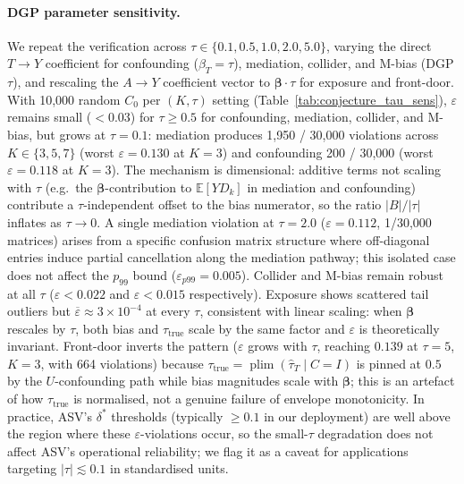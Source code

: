 \paragraph{DGP parameter sensitivity.}
We repeat the verification across $\tau \in \{0.1, 0.5, 1.0, 2.0, 5.0\}$, varying the direct $T{\to}Y$ coefficient for confounding ($\beta_T{=}\tau$), mediation, collider, and M-bias (DGP $\tau$), and rescaling the $A{\to}Y$ coefficient vector to $\boldsymbol{\beta}\cdot\tau$ for exposure and front-door. With 10{,}000 random $C_0$ per $(K,\tau)$ setting (Table~\ref{tab:conjecture_tau_sens}), $\varepsilon$ remains small ($< 0.03$) for $\tau \geq 0.5$ for confounding, mediation, collider, and M-bias, but grows at $\tau{=}0.1$: mediation produces 1{,}950 / 30{,}000 violations across $K \in \{3,5,7\}$ (worst $\varepsilon{=}0.130$ at $K{=}3$) and confounding 200 / 30{,}000 (worst $\varepsilon{=}0.118$ at $K{=}3$). The mechanism is dimensional: additive terms not scaling with $\tau$ (e.g.\ the $\boldsymbol{\beta}$-contribution to $\mathbb{E}[Y D_k]$ in mediation and confounding) contribute a $\tau$-independent offset to the bias numerator, so the ratio $|B|/|\tau|$ inflates as $\tau \to 0$. A single mediation violation at $\tau{=}2.0$ ($\varepsilon{=}0.112$, 1/30{,}000 matrices) arises from a specific confusion matrix structure where off-diagonal entries induce partial cancellation along the mediation pathway; this isolated case does not affect the $p_{99}$ bound ($\varepsilon_{p99}{=}0.005$). Collider and M-bias remain robust at all $\tau$ ($\varepsilon{<}0.022$ and $\varepsilon{<}0.015$ respectively). Exposure shows scattered tail outliers but $\overline{\varepsilon} \approx 3\!\times\!10^{-4}$ at every $\tau$, consistent with linear scaling: when $\boldsymbol{\beta}$ rescales by $\tau$, both bias and $\tau_{\text{true}}$ scale by the same factor and $\varepsilon$ is theoretically invariant. Front-door inverts the pattern ($\varepsilon$ grows with $\tau$, reaching $0.139$ at $\tau{=}5$, $K{=}3$, with 664 violations) because $\tau_{\text{true}} = \operatorname{plim}(\hat{\tau}_T \mid C{=}I)$ is pinned at $0.5$ by the $U$-confounding path while bias magnitudes scale with $\boldsymbol{\beta}$; this is an artefact of how $\tau_{\text{true}}$ is normalised, not a genuine failure of envelope monotonicity. In practice, ASV's $\delta^*$ thresholds (typically $\geq 0.1$ in our deployment) are well above the region where these $\varepsilon$-violations occur, so the small-$\tau$ degradation does not affect ASV's operational reliability; we flag it as a caveat for applications targeting $|\tau| \lesssim 0.1$ in standardised units.

